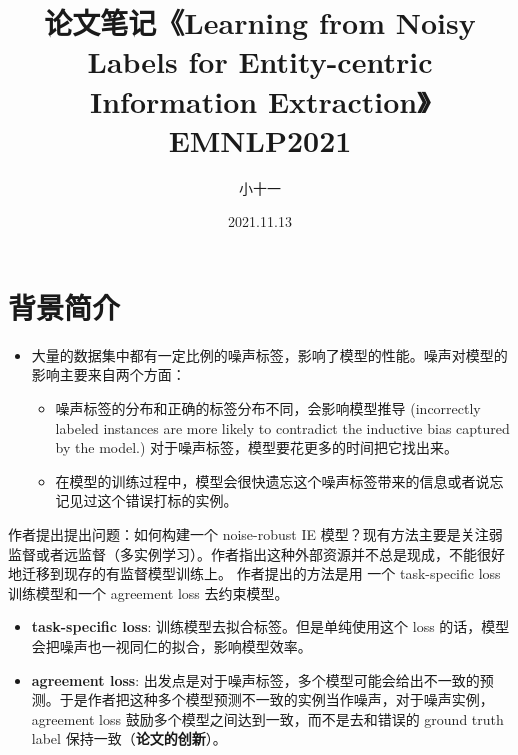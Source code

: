 \documentclass{article}
\title{论文笔记《Learning from Noisy Labels for Entity-centric Information Extraction》EMNLP2021}
\author{小十一}
\date{2021.11.13}
\begin{document}
\maketitle

\section{背景简介}
\begin{itemize}
   
    \item 大量的数据集中都有一定比例的噪声标签，影响了模型的性能。噪声对模型的影响主要来自两个方面：
          \begin{itemize}
              \item 噪声标签的分布和正确的标签分布不同，会影响模型推导   (incorrectly labeled instances are more likely to contradict the inductive bias captured by the model.) 对于噪声标签，模型要花更多的时间把它找出来。
              \item 在模型的训练过程中，模型会很快遗忘这个噪声标签带来的信息或者说忘记见过这个错误打标的实例。
          \end{itemize}
\end{itemize}
作者提出提出问题：如何构建一个 noise-robust IE 模型？现有方法主要是关注弱监督或者远监督（多实例学习）。作者指出这种外部资源并不总是现成，不能很好地迁移到现存的有监督模型训练上。
作者提出的方法是用 一个 task-specific loss 训练模型和一个 agreement loss 去约束模型。
\begin{itemize}
    \item \textbf{task-specific loss}: 训练模型去拟合标签。但是单纯使用这个 loss 的话，模型会把噪声也一视同仁的拟合，影响模型效率。
    \item \textbf{agreement loss}: 出发点是对于噪声标签，多个模型可能会给出不一致的预测。于是作者把这种多个模型预测不一致的实例当作噪声，对于噪声实例，agreement loss 鼓励多个模型之间达到一致，而不是去和错误的 ground truth label 保持一致（\textbf{论文的创新}）。
\end{itemize}
\end{document}
